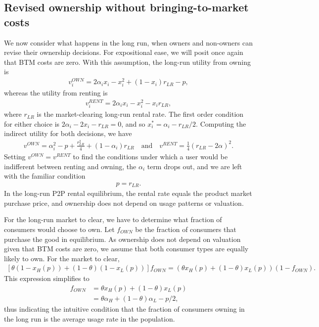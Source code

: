 \documentclass[11pt]{article}
\begin{document}
\subsection{Revised ownership without bringing-to-market costs}
We now consider what happens in the long run, when owners and non-owners can revise their ownership decisions.
For expositional ease, we will posit once again that BTM costs are zero. 
With this assumption, the long-run utility from owning is 
\begin{align}
v^{OWN}_i = 2\alpha_i x_i - x_i^2 + (1-x_i)r_{LR} - p,   
\end{align} 
whereas the utility from renting is 
\begin{align}
v^{RENT}_{i} = 2\alpha_i x_i - x_i^2 - x_i r_{LR}, 
\end{align} 
where $r_{LR}$ is the market-clearing long-run rental rate. 
The first order condition for either choice is $2 \alpha_i - 2 x_i - r_{LR} = 0$, and so $x^*_i = \alpha_i - r_{LR}/2$. 
Computing the indirect utility for both decisions, we have
\begin{align} 
v^{OWN} = \alpha_i^2 - p + \frac{r_{LR}^2}{4} + (1 - \alpha_i) r_{LR} \quad  \mbox{and} \quad v^{RENT} = \frac{1}{4} (r_{LR}- 2\alpha )^2. 
\end{align} 
Setting $v^{OWN} = v^{RENT}$ to find the conditions under which a user would be indifferent between renting and owning, the $\alpha_i$ term drops out, and we are left with the familiar condition 
\begin{align} \label{eq:lr_eq_r}
p = r_{LR}. 
\end{align}
In the long-run P2P rental equilibrium, the rental rate equals the product market purchase price, and ownership does not depend on usage patterns or valuation.  

For the long-run market to clear, we have to determine what fraction of consumers would choose to own. 
Let $f_{OWN}$ be the fraction of consumers that purchase the good in equilibrium. 
As ownership does not depend on valuation given that BTM costs are zero, we assume that both consumer types are equally likely to own. 
For the market to clear, 
\begin{align}
\left[ \theta (1-x_H(p)) + (1-\theta)(1-x_L(p))\right]f_{OWN} = \left(\theta x_H(p) + (1-\theta)x_L(p) \right)(1- f_{OWN}). 
\end{align} 
This expression simplifies to 
\begin{align}
  f_{OWN} &= \theta x_H(p) + (1-\theta)x_L(p) \\
         &= \theta \alpha_H + (1 - \theta) \alpha_L- p/2,
\end{align} 
thus indicating the intuitive condition that the fraction of consumers owning in the long run is the average usage rate in the population.  
\end{document}
